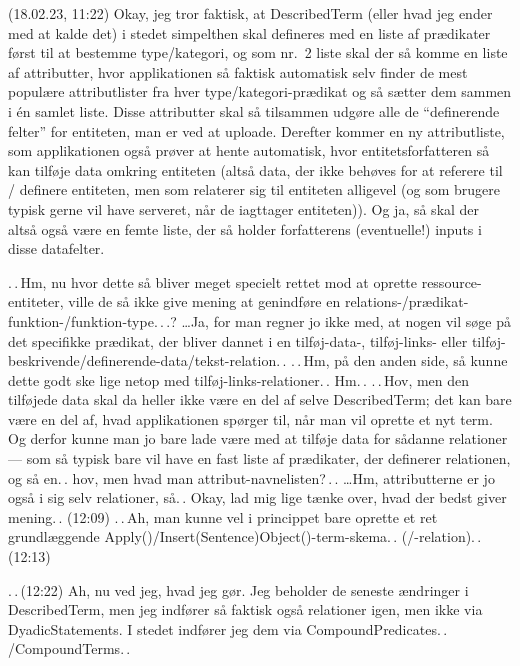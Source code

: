 \documentclass{report}
\begin{document}
(18.02.23, 11:22) Okay, jeg tror faktisk, at DescribedTerm (eller hvad jeg ender med at kalde det) i stedet simpelthen skal defineres med en liste af prædikater først til at bestemme type/kategori, og som nr.\ 2 liste skal der så komme en liste af attributter, hvor applikationen så faktisk automatisk selv finder de mest populære attributlister fra hver type/kategori-prædikat og så sætter dem sammen i én samlet liste. Disse attributter skal så tilsammen udgøre alle de ``definerende felter'' for entiteten, man er ved at uploade. Derefter kommer en ny attributliste, som applikationen også prøver at hente automatisk, hvor entitetsforfatteren så kan tilføje data omkring entiteten (altså data, der ikke behøves for at referere til / definere entiteten, men som relaterer sig til entiteten alligevel (og som brugere typisk gerne vil have serveret, når de iagttager entiteten)). Og ja, så skal der altså også være en femte liste, der så holder forfatterens (eventuelle!) inputs i disse datafelter. 

.\,.\,Hm, nu hvor dette så bliver meget specielt rettet mod at oprette ressource-entiteter, ville de så ikke give mening at genindføre en relations-/prædikat-funktion-/funktion-type.\,.\,.? \ldots Ja, for man regner jo ikke med, at nogen vil søge på det specifikke prædikat, der bliver dannet i en tilføj-data-, tilføj-links- eller tilføj-beskrivende/definerende-data/tekst-relation.\,. 
.\,.\,Hm, på den anden side, så kunne dette godt ske lige netop med tilføj-links-relationer.\,. Hm.\,. .\,.\,Hov, men den tilføjede data skal da heller ikke være en del af selve DescribedTerm; det kan bare være en del af, hvad applikationen spørger til, når man vil oprette et nyt term. Og derfor kunne man jo bare lade være med at tilføje data for sådanne relationer --- som så typisk bare vil have en fast liste af prædikater, der definerer relationen, og så en.\,. hov, men hvad man attribut-navnelisten?\,.\,. \ldots Hm, attributterne er jo også i sig selv relationer, så.\,. Okay, lad mig lige tænke over, hvad der bedst giver mening.\,. (12:09) .\,.\,Ah, man kunne vel i princippet bare oprette et ret grundlæggende Apply()/Insert(Sentence)Object()-term-skema.\,. (/-relation).\,. (12:13)

.\,.\,(12:22) Ah, nu ved jeg, hvad jeg gør. Jeg beholder de seneste ændringer i DescribedTerm, men jeg indfører så faktisk også relationer igen, men ikke via DyadicStatements. I stedet indfører jeg dem via CompoundPredicates.\,. /CompoundTerms.\,.  
\end{document}

